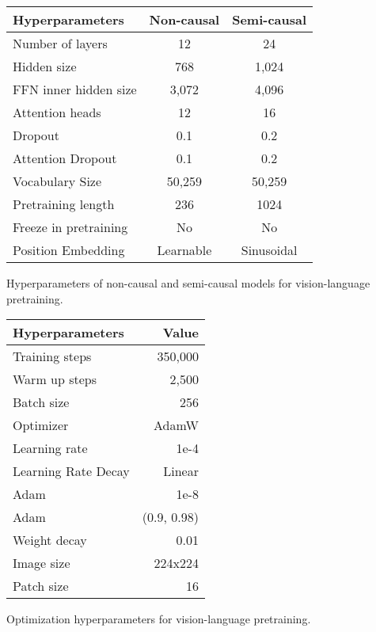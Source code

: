 \documentclass{article}
\theoremstyle{plain}
\theoremstyle{definition}
\theoremstyle{remark}
\begin{document}
\noindent\hspace{0.03\linewidth}\begin{minipage}[c]{0.5\textwidth}
\small
\centering
\begin{tabular}{lcc}
\toprule
\textbf{Hyperparameters} & \textbf{Non-causal} & \textbf{Semi-causal} \\ \midrule
Number of layers & 12 & 24 \\
Hidden size & 768 & 1,024 \\
FFN inner hidden size & 3,072 & 4,096 \\
Attention heads & 12 & 16 \\
Dropout & 0.1 & 0.2 \\
Attention Dropout & 0.1 & 0.2 \\
Vocabulary Size & 50,259 & 50,259 \\
Pretraining length & 236 & 1024 \\
Freeze in pretraining & No & No \\
Position Embedding & Learnable & Sinusoidal \\
\bottomrule
\end{tabular}
\captionsetup{type=table}
\caption{Hyperparameters of non-causal and semi-causal models for vision-language pretraining.}
\label{tbl:hyperparam:vl:pt:model}
\end{minipage}
\hfill
\begin{minipage}[c]{0.4\textwidth}
\small
\centering
\begin{tabular}{lr}
\toprule
\textbf{Hyperparameters} & \textbf{Value} \\ \midrule
Training steps & 350,000 \\
Warm up steps & 2,500 \\
Batch size & 256 \\
Optimizer & AdamW \\
Learning rate & 1e-4 \\
Learning Rate Decay & Linear \\
Adam  & 1e-8 \\
Adam  & (0.9, 0.98) \\
Weight decay & 0.01 \\
Image size  & 224x224 \\
Patch size  & 16 \\
\bottomrule
\end{tabular}
\captionsetup{type=table}
\caption{Optimization hyperparameters for vision-language pretraining.}
\label{tab:vl:hyperparam:pt:opt}
\end{minipage}
\end{document}
